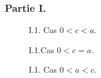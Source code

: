 \subsubsection*{Partie I.}
\begin{figure}
	\begin{center}
	
	\end{center}
\caption{I.1. Cas $0<c<a$.}
\label{fig:Cconi2_1}
\end{figure} 
\begin{figure}
	\begin{center}
	
	\end{center}
\caption{I.1.Cas $0<c=a$.}
\label{fig:Cconi2_2}
\end{figure} 
\begin{figure}
	\begin{center}
	
	\end{center}
\caption{I.1. Cas $0<a<c$.}
\label{fig:Cconi2_3}
\end{figure} 

